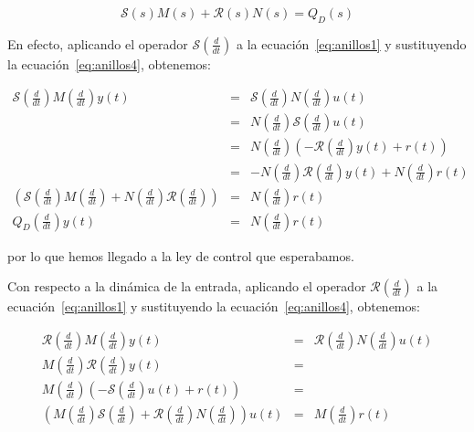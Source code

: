             \begin{equation} \label{eq:anillos5}
                \mathcal{S}(s) M(s) + \mathcal{R}(s) N(s) = Q_D(s)
            \end{equation}

            En efecto, aplicando el operador $\mathcal{S} \left( \frac{d}{dt} \right)$ a la ecuación~\ref{eq:anillos1} y sustituyendo la ecuación~\ref{eq:anillos4}, obtenemos:

            \begin{eqnarray*}
                \mathcal{S} \left( \frac{d}{dt} \right) M \left( \frac{d}{dt} \right) y(t) & = & \mathcal{S} \left( \frac{d}{dt} \right) N \left( \frac{d}{dt} \right) u(t) \\
                & = & N \left( \frac{d}{dt} \right) \mathcal{S} \left( \frac{d}{dt} \right) u(t) \\
                & = & N \left( \frac{d}{dt} \right) \left( -\mathcal{R} \left( \frac{d}{dt} \right) y(t) + r(t) \right) \\
                & = & -N \left( \frac{d}{dt} \right) \mathcal{R} \left( \frac{d}{dt} \right) y(t) + N \left( \frac{d}{dt} \right) r(t) \\
                \left( \mathcal{S} \left( \frac{d}{dt} \right) M \left( \frac{d}{dt} \right) + N \left( \frac{d}{dt} \right) \mathcal{R} \left( \frac{d}{dt} \right) \right) & = & N \left( \frac{d}{dt} \right) r(t) \\
                Q_D \left( \frac{d}{dt} \right) y(t) & = & N \left( \frac{d}{dt} \right) r(t)
            \end{eqnarray*}

            por lo que hemos llegado a la ley de control que esperabamos.

            Con respecto a la dinámica de la entrada, aplicando el operador $\mathcal{R}\left( \frac{d}{dt} \right)$ a la ecuación~\ref{eq:anillos1} y sustituyendo la ecuación~\ref{eq:anillos4}, obtenemos:

            \begin{eqnarray*}
                \mathcal{R} \left( \frac{d}{dt} \right) M \left( \frac{d}{dt} \right) y(t) & = & \mathcal{R} \left( \frac{d}{dt} \right) N \left( \frac{d}{dt} \right) u(t) \\
                M \left( \frac{d}{dt} \right) \mathcal{R} \left( \frac{d}{dt} \right) y(t) & = & \\
                M \left( \frac{d}{dt} \right) \left( -\mathcal{S} \left( \frac{d}{dt} \right) u(t) + r(t) \right) & = & \\
                \left( M \left( \frac{d}{dt} \right) \mathcal{S} \left( \frac{d}{dt} \right) + \mathcal{R} \left( \frac{d}{dt} \right) N \left( \frac{d}{dt} \right) \right) u(t) & = & M \left( \frac{d}{dt} \right) r(t)
            \end{eqnarray*}

